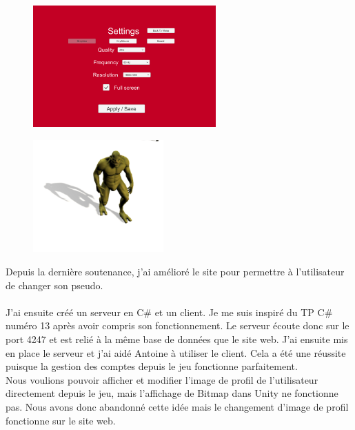 \documentclass[titlepage, 13px, a4paper]{report}
\begin{document}
\paragraph{} \hspace{0pt} \\
\begin{figure}
\includegraphics[width=7cm]{image/cedric_parametre.png}
\end{figure}
\begin{figure}
\includegraphics[width=5cm]{image/cedric_shadowminer.png}
\end{figure}
Depuis la dernière soutenance, j'ai amélioré le site pour permettre à l’utilisateur de changer son pseudo. \\ \\

J’ai ensuite créé un serveur en C\# et un client. Je me suis inspiré du TP C\# numéro 13 après avoir compris son fonctionnement. Le serveur écoute donc sur le port 4247 et est relié à la même base de données que le site web. J’ai ensuite mis en place le serveur et j’ai aidé Antoine à utiliser le client.
Cela a été une réussite puisque la gestion des comptes depuis le jeu fonctionne parfaitement. \\
Nous voulions pouvoir afficher et modifier l’image de profil de l’utilisateur directement depuis le jeu, 
mais l’affichage de Bitmap dans Unity ne fonctionne pas. Nous avons donc abandonné cette idée mais le 
changement d’image de profil fonctionne sur le site web. \\ \\
\end{document}
